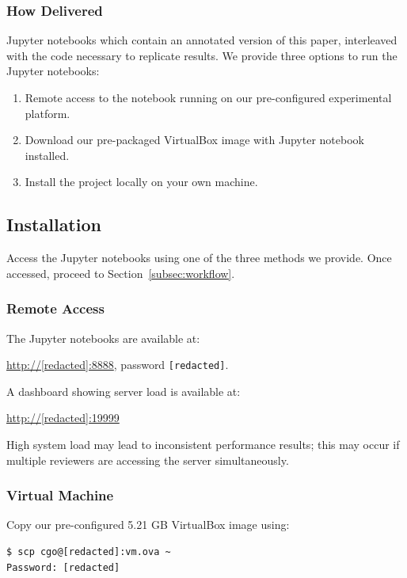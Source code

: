 \subsubsection{How Delivered}

Jupyter notebooks which contain an annotated version of this paper, interleaved with the code necessary to replicate results. We provide three options to run the Jupyter notebooks:
\begin{enumerate}
  \item Remote access to the notebook running on our pre-configured experimental platform.
  \item Download our pre-packaged VirtualBox image with Jupyter notebook installed.
  \item Install the project locally on your own machine.
\end{enumerate}

\subsection{Installation}\label{subsec:installation}

Access the Jupyter notebooks using one of the three methods we provide. Once accessed, proceed to Section~\ref{subsec:workflow}.

\subsubsection{Remote Access}

The Jupyter notebooks are available at:

\url{http://[redacted]:8888}, password \texttt{[redacted]}.

\vspace{1em}
\noindent
A dashboard showing server load is available at:

\url{http://[redacted]:19999}

\vspace{1em}
\noindent
High system load may lead to inconsistent performance results; this may occur if multiple reviewers are accessing the server simultaneously.

\newpage
\subsubsection{Virtual Machine}

Copy our pre-configured 5.21 GB VirtualBox image using:
\begin{verbatim}
$ scp cgo@[redacted]:vm.ova ~
Password: [redacted]
\end{verbatim}

